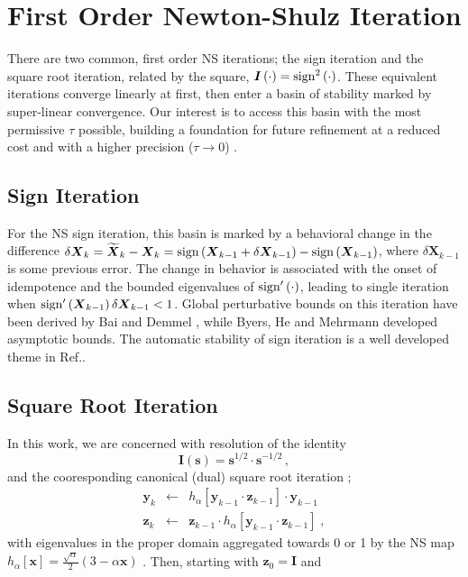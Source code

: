 \documentclass[letterpaper,twocolumn,amsmath,amsfont,amssymb,english,aps,jcp,preprintnumbers,groupaddress,nofootinbib,tightenlines,floatfix]{revtex4}
\newcommand{\mat}[1]{\boldsymbol{#1}}
\theoremstyle{plain}
\theoremstyle{remark}
\theoremstyle{plain}
\begin{document}

\section{First Order Newton-Shulz Iteration}

There are two common, first order NS iterations; the sign iteration
and the square root iteration, related by the square, $\mat{I}\left(
\cdot \right)= {\rm sign}^2\left( \cdot \right) $.  These equivalent
iterations converge linearly at first, then enter a basin of stability
marked by super-linear convergence.  Our interest is to access this
basin with the most permissive $\tau$ possible, building a foundation
for future refinement
at a reduced cost and with a higher precision ($\tau \rightarrow 0$)
\cite{MChallacombe16}.

\subsection{Sign Iteration}

For the NS sign iteration, this basin is marked by a behavioral change
in the difference $\delta \mat{X}_k = \widetilde{\mat{X}}_k -\mat{X}_k
= {\rm sign} \left(\mat{X}_{k-1}+\delta \mat{X}_{k-1} \right) -{\rm
  sign} \left(\mat{X}_{k-1} \right)$, where $\delta \mat{X}_{k-1}$ is
some previous error.  The change in behavior is associated with the
onset of idempotence and the bounded eigenvalues of ${\rm sign}'\left(
\cdot \right)$, leading to single iteration when ${\rm sign}'\left(
\mat{X}_{k-1} \right) \delta \mat{X}_{k-1} < 1 $.  Global perturbative
bounds on this iteration have been derived by Bai and Demmel
\cite{Bai98usingthe}, while Byers, He and Mehrmann \cite{} developed
asymptotic bounds.  The automatic stability of sign iteration is a
well developed theme in Ref.\cite{Higham08}.

\subsection{Square Root Iteration}

In this work, we are concerned with resolution of the identity \cite{}
\begin{equation}
\mat{I} \left( \mat{s} \right) =\mat{s}^{1/2} \cdot \mat{s}^{-1/2} \, ,
\end{equation}
and the cooresponding canonical (dual) square root iteration \cite{};
\begin{eqnarray}\label{cannonical}
\mat{y}_k &\leftarrow& h_\alpha \left[ \mat{y}_{k-1} \cdot \mat{z}_{k-1} \right] \cdot \mat{y}_{k-1}  \nonumber \\
\mat{z}_k &\leftarrow& \mat{z}_{k-1} \cdot h_\alpha \left[ \mat{y}_{k-1} \cdot \mat{z}_{k-1} \right] \; ,
\end{eqnarray}
with eigenvalues in the proper domain aggregated towards 0 or 1 by the
NS map $h_\alpha[\mat{x}]=\frac{\sqrt{\alpha}}{2} \left(3-\alpha
\mat{x} \right)$ \cite{}.  Then, starting with $\mat{z}_0=\mat{I}$ and
\end{document}
